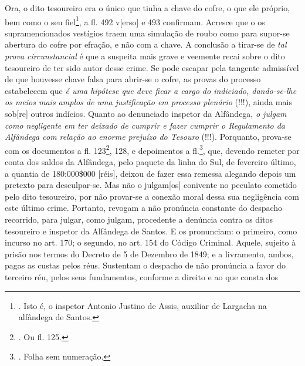 Ora, o dito tesoureiro era o único que tinha a chave do cofre, o que ele
próprio, bem como o seu fiel\footnote{. Isto é, o inspetor Antonio
  Justino de Assis, auxiliar de Largacha na alfândega de Santos.}, a fl.
492 v{[}erso{]} e 493 confirmam. Acresce que o os supramencionados
vestígios traem uma simulação de roubo como para supor-se abertura do
cofre por efração, e não com a chave. A conclusão a tirar-se de
\emph{tal prova circunstancial} é que a suspeita mais grave e veemente
recai sobre o dito tesoureiro de ter sido autor desse crime. Se pode
escapar pela tangente admissível de que houvesse chave falsa para
abrir-se o cofre, as provas do processo estabelecem que \emph{é uma
hipótese que deve ficar a cargo do indiciado, dando-se-lhe os meios mais
amplos de uma justificação em processo plenário} (!!!), ainda mais
sob{[}re{]} outros indícios. Quanto ao denunciado inspetor da Alfândega,
\emph{o julgam como negligente em ter deixado de cumprir e fazer cumprir
o Regulamento da Alfândega com relação ao enorme prejuízo do Tesouro}
(!!!). Porquanto, prova-se com os documentos a fl. 123\footnote{. Ou fl.
  125.}, 128, e depoimentos a fl.\footnote{. Folha sem numeração.}, que,
devendo remeter por conta dos saldos da Alfândega, pelo paquete da linha
do Sul, de fevereiro último, a quantia de 180:000\$000 {[}réis{]},
deixou de fazer essa remessa alegando depois um pretexto para
desculpar-se. Mas não o julgam{[}os{]} conivente no peculato cometido
pelo dito tesoureiro, por não provar-se a conexão moral dessa sua
negligência com este último crime. Portanto, revogam a não pronúncia
constante do despacho recorrido, para julgar, como julgam, procedente a
denúncia contra os ditos tesoureiro e inspetor da Alfândega de Santos. E
os pronunciam: o primeiro, como incurso no art. 170; o segundo, no art.
154 do Código Criminal. Aquele, sujeito à prisão nos termos do Decreto
de 5 de Dezembro de 1849; e a livramento, ambos, pagas as custas pelos
réus. Sustentam o despacho de não pronúncia a favor do terceiro réu,
pelos seus fundamentos, conforme a direito e ao que consta dos
